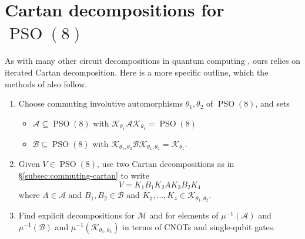 \documentclass[reqno]{amsart}
\theoremstyle{definition} \newtheorem{example}[theorem]{Example}
\newcommand{\SU}{\operatorname{SU}}
\newcommand{\SO}{\operatorname{SO}}
\newcommand{\PSO}{\operatorname{PSO}}
\newcommand{\Sp}{\operatorname{Sp}}
\renewcommand{\O}{\operatorname{O}}
\DeclareMathOperator{\id}{id}
\DeclareMathOperator{\Inn}{Inn}
\renewcommand{\P}{\operatorname{P}}
\newcommand{\secsymbol}{§}
\renewcommand{\S}{\operatorname{S}}
\newcommand{\K}{\mathcal{K}}
\newcommand{\A}{\mathcal{A}}
\newcommand{\B}{\mathcal{B}}
\newcommand{\M}{\mathcal{M}}
\newcommand{\Z}{\mathcal{Z}}
\begin{document}





\section{Cartan decompositions for $\PSO(8)$} \label{sec:pso8-cartan}
As with many other circuit decompositions in quantum computing \cite{CCD,drury-love,khaneja-glaser,block-ZXZ,quantum-shannon,wei-di}, ours relies on iterated Cartan decomposition. Here is a more specific outline, which the methods of \cite{wei-di} also follow.
\begin{enumerate}[1.]
\item Choose commuting involutive automorphisms $\theta_1, \theta_2$ of $\PSO(8)$, and sets
\begin{itemize}
\item $\A \subseteq \PSO(8)$ with $\K_{\theta_1}\A\K_{\theta_1} = \PSO(8)$
\item $\B \subseteq \PSO(8)$ with $\K_{\theta_1,\theta_2}\B\K_{\theta_1,\theta_2} = \K_{\theta_1}$.
\end{itemize}
\item Given $V \in \PSO(8)$, use two Cartan decompositions as in \secsymbol\ref{subsec:commuting-cartan} to write
\begin{equation} \label{eq:double-decomp}
V = K_1 B_1 K_2 A K_3 B_2 K_4
\end{equation}
where $A \in \A$ and $B_1,B_2 \in \B$ and $K_1,\ldots,K_4 \in \K_{\theta_1,\theta_2}$. 

\item Find explicit decompositions for $\M$ and for elements of $\mu^{-1}(\A)$ and $\mu^{-1}(\B)$ and $\mu^{-1}(\K_{\theta_1,\theta_2})$ in terms of CNOTs and single-qubit gates.
\end{enumerate}
\end{document}
